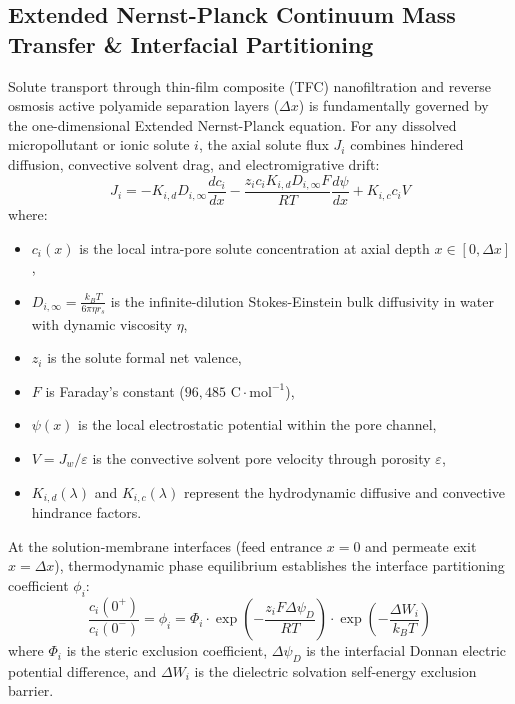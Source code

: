 \documentclass[11pt]{article}
\begin{document}
\subsection{Extended Nernst-Planck Continuum Mass Transfer \& Interfacial Partitioning}
\label{sec:dspm}
Solute transport through thin-film composite (TFC) nanofiltration and reverse osmosis active polyamide separation layers ($\Delta x$) is fundamentally governed by the one-dimensional Extended Nernst-Planck equation. For any dissolved micropollutant or ionic solute $i$, the axial solute flux $J_i$ combines hindered diffusion, convective solvent drag, and electromigrative drift:
\begin{equation}
J_i = -K_{i,d} D_{i,\infty} \frac{dc_i}{dx} - \frac{z_i c_i K_{i,d} D_{i,\infty} F}{RT} \frac{d\psi}{dx} + K_{i,c} c_i V
\label{eq:s_enp}
\end{equation}
where:
\begin{itemize}[leftmargin=1.0cm]
    \item $c_i(x)$ is the local intra-pore solute concentration at axial depth $x \in [0, \Delta x]$,
    \item $D_{i,\infty} = \frac{k_B T}{6 \pi \eta r_s}$ is the infinite-dilution Stokes-Einstein bulk diffusivity in water with dynamic viscosity $\eta$,
    \item $z_i$ is the solute formal net valence,
    \item $F$ is Faraday's constant ($96{,}485\text{ C}\cdot\text{mol}^{-1}$),
    \item $\psi(x)$ is the local electrostatic potential within the pore channel,
    \item $V = J_w / \varepsilon$ is the convective solvent pore velocity through porosity $\varepsilon$,
    \item $K_{i,d}(\lambda)$ and $K_{i,c}(\lambda)$ represent the hydrodynamic diffusive and convective hindrance factors.
\end{itemize}

At the solution-membrane interfaces (feed entrance $x = 0$ and permeate exit $x = \Delta x$), thermodynamic phase equilibrium establishes the interface partitioning coefficient $\phi_i$:
\begin{equation}
\frac{c_i(0^+)}{c_i(0^-)} = \phi_i = \Phi_i \cdot \exp\left(-\frac{z_i F \Delta \psi_D}{RT}\right) \cdot \exp\left(-\frac{\Delta W_i}{k_B T}\right)
\label{eq:s_partitioning}
\end{equation}
where $\Phi_i$ is the steric exclusion coefficient, $\Delta \psi_D$ is the interfacial Donnan electric potential difference, and $\Delta W_i$ is the dielectric solvation self-energy exclusion barrier.
\end{document}

